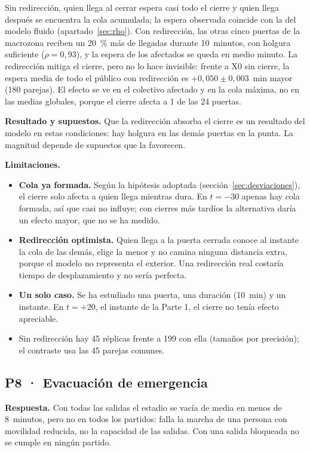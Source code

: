Sin redirección, quien llega al cerrar espera casi todo el cierre y quien llega
después se encuentra la cola acumulada; la espera observada coincide con la del
modelo fluido (apartado~\ref{sec:rho}). Con redirección, las otras cinco puertas
de la macrozona reciben un 20~\% más de llegadas durante 10~minutos, con holgura
suficiente ($\rho=0{,}93$), y la espera de los afectados se queda en medio
minuto. La redirección mitiga el cierre, pero no lo hace invisible: frente a X0
sin cierre, la espera media de todo el público con redirección es
$+0{,}050 \pm 0{,}003$~min mayor (180 parejas). El efecto se ve en el colectivo
afectado y en la cola máxima, no en las medias globales, porque el cierre afecta
a 1 de las 24 puertas.

\textbf{Resultado y supuestos.} Que la redirección absorba el cierre es un
resultado del modelo en estas condiciones: hay holgura en las demás puertas en
la punta. La magnitud depende de supuestos que la favorecen.

\textbf{Limitaciones.}
\begin{itemize}
  \item \textbf{Cola ya formada.} Según la hipótesis adoptada
    (sección~\ref{sec:desviaciones}), el cierre solo afecta a quien llega
    mientras dura. En $t=-30$ apenas hay cola formada, así que casi no influye;
    con cierres más tardíos la alternativa daría un efecto mayor, que no se ha
    medido.
  \item \textbf{Redirección optimista.} Quien llega a la puerta cerrada conoce al
    instante la cola de las demás, elige la menor y no camina ninguna distancia
    extra, porque el modelo no representa el exterior. Una redirección real
    costaría tiempo de desplazamiento y no sería perfecta.
  \item \textbf{Un solo caso.} Se ha estudiado una puerta, una duración (10~min) y
    un instante. En $t=+20$, el instante de la Parte 1, el cierre no tenía efecto
    apreciable.
  \item Sin redirección hay 45 réplicas frente a 199 con ella (tamaños por
    precisión); el contraste usa las 45 parejas comunes.
\end{itemize}

\subsection{P8 · Evacuación de emergencia}

\textbf{Respuesta.} Con todas las salidas el estadio se vacía de media en menos
de 8~minutos, pero no en todos los partidos: falla la marcha de una persona con
movilidad reducida, no la capacidad de las salidas. Con una salida bloqueada no
se cumple en ningún partido.

